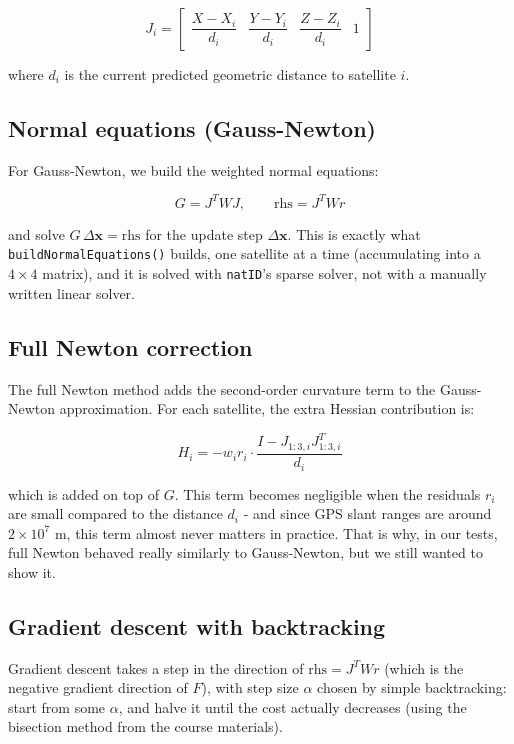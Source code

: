 \documentclass[11pt]{article}
\begin{document}
\[
J_i = \begin{bmatrix} \dfrac{X - X_i}{d_i} & \dfrac{Y - Y_i}{d_i} & \dfrac{Z - Z_i}{d_i} & 1 \end{bmatrix}
\]

where $d_i$ is the current predicted geometric distance to satellite $i$.

\subsection{Normal equations (Gauss-Newton)}

For Gauss-Newton, we build the weighted normal equations:

\[
G = J^T W J, \qquad \text{rhs} = J^T W r
\]

and solve $G \, \Delta\mathbf{x} = \text{rhs}$ for the update step $\Delta\mathbf{x}$. This is exactly what \texttt{buildNormalEquations()} builds, one satellite at a time (accumulating into a $4\times4$ matrix), and it is solved with \texttt{natID}'s sparse solver, not with a manually written linear solver.

\subsection{Full Newton correction}

The full Newton method adds the second-order curvature term to the Gauss-Newton approximation. For each satellite, the extra Hessian contribution is:

\[
H_i = -w_i r_i \cdot \frac{I - J_{1:3,i} J_{1:3,i}^T}{d_i}
\]

which is added on top of $G$. This term becomes negligible when the residuals $r_i$ are small compared to the distance $d_i$ - and since GPS slant ranges are around $2 \times 10^7$ m, this term almost never matters in practice. That is why, in our tests, full Newton behaved really similarly to Gauss-Newton, but we still wanted to show it.

\subsection{Gradient descent with backtracking}

Gradient descent takes a step in the direction of $\text{rhs} = J^T W r$ (which is the negative gradient direction of $F$), with step size $\alpha$ chosen by simple backtracking: start from some $\alpha$, and halve it until the cost actually decreases (using the bisection method from the course materials).
\end{document}
